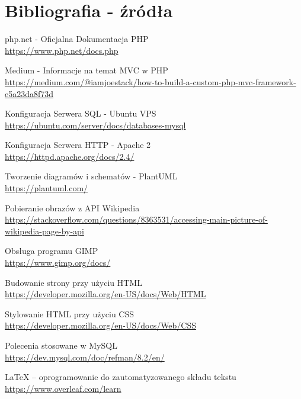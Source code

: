 
\section{Bibliografia - źródła }

\begin{thebibliography}{9}
    php.net - Oficjalna Dokumentacja PHP\\
    \url{https://www.php.net/docs.php}

    Medium - Informacje na temat MVC w PHP\\
    \url{https://medium.com/@iamjoestack/how-to-build-a-custom-php-mvc-framework-e5a23da8f73d}

    Konfiguracja Serwera SQL - Ubuntu VPS\\
    \url{https://ubuntu.com/server/docs/databases-mysql}


    Konfiguracja Serwera HTTP -  Apache 2\\
    \url{https://httpd.apache.org/docs/2.4/}

    Tworzenie diagramów i schematów - PlantUML\\
    \url{https://plantuml.com/}


    Pobieranie obrazów z API Wikipedia\\
    \url{https://stackoverflow.com/questions/8363531/accessing-main-picture-of-wikipedia-page-by-api}


    Obsługa programu GIMP\\
    \url{https://www.gimp.org/docs/}

    Budowanie strony przy użyciu HTML\\
    \url{https://developer.mozilla.org/en-US/docs/Web/HTML}

    Stylowanie HTML przy użyciu CSS\\
    \url{https://developer.mozilla.org/en-US/docs/Web/CSS}

    Polecenia stosowane w MySQL\\
    \url{https://dev.mysql.com/doc/refman/8.2/en/}

    LaTeX – oprogramowanie do zautomatyzowanego składu tekstu\\
    \url{https://www.overleaf.com/learn}
    
\end{thebibliography}
